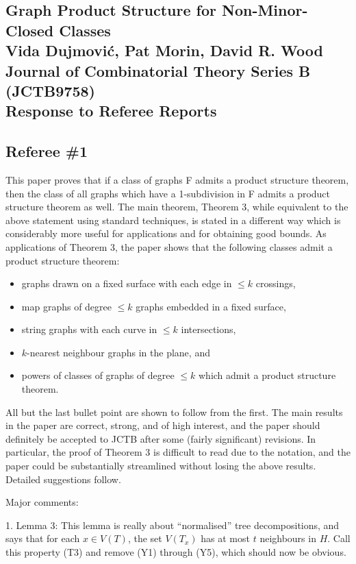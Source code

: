 \documentclass[12pt]{article}
\begin{document}
\subsection*{Graph Product Structure for Non-Minor-Closed Classes\\
Vida Dujmovi\'c, Pat Morin, David R. Wood\\
Journal of Combinatorial Theory Series B (JCTB9758)\\
Response to Referee Reports}
		
\subsection*{Referee \#1}

This paper proves that if a class of graphs F admits a product structure
theorem, then the class of all graphs which have a 1-subdivision in F admits
a product structure theorem as well. The main theorem, Theorem 3, while
equivalent to the above statement using standard techniques, is stated in
a different way which is considerably more useful for applications and for
obtaining good bounds. As applications of Theorem 3, the paper shows that
the following classes admit a product structure theorem:

\begin{itemize}
\item graphs drawn on a fixed surface with each edge in $\leq k$ crossings,
\item map graphs of degree $\leq k$ graphs embedded in a fixed surface,
\item string graphs with each curve in $\leq k$ intersections,
\item $k$-nearest neighbour graphs in the plane, and
\item powers of classes of graphs of degree $\leq k$ which admit a product structure theorem.
\end{itemize}

All but the last bullet point are shown to follow from the first.
The main results in the paper are correct, strong, and of high interest,
and the paper should definitely be accepted to JCTB after some
(fairly significant) revisions. In particular, the proof of Theorem 3 is
difficult to read due to the notation, and the paper could be substantially
streamlined without losing the above results. Detailed suggestions follow.

Major comments:

1. Lemma 3: This lemma is really about “normalised” tree decompositions, and says that for each $x \in V(T)$, the set $V(T_x)$ has at most $t$ neighbours in $H$. Call this property (T3) and remove (Y1)  through (Y5), which should now be obvious.
\end{document}
